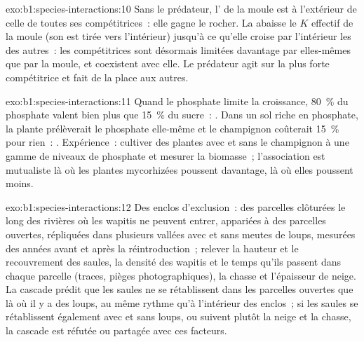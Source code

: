 \begin{solution}{exo:b1:species-interactions:10}
Sans le prédateur, l' de la moule est à l'extérieur de celle de
toutes ses compétitrices~: elle gagne le rocher. La  abaisse le
$K$ effectif de la moule (son  est tirée vers l'intérieur)
jusqu'à ce qu'elle croise par l'intérieur les  des autres~: les
compétitrices sont désormais limitées davantage par elles-mêmes que par
la moule, et coexistent avec elle. Le prédateur agit sur la plus forte
compétitrice et fait de la place aux autres.
\end{solution}

\begin{solution}{exo:b1:species-interactions:11}
Quand le phosphate limite la croissance, \qty{80}{\%} du phosphate
valent bien plus que \qty{15}{\%} du sucre~: . Dans un sol
riche en phosphate, la plante prélèverait le phosphate elle-même et le
champignon coûterait \qty{15}{\%} pour rien~: . Expérience~:
cultiver des plantes avec et sans le champignon à une gamme de niveaux
de phosphate et mesurer la biomasse~; l'association est mutualiste là où
les plantes mycorhizées poussent davantage,  là où elles
poussent moins.
\end{solution}

\begin{solution}{exo:b1:species-interactions:12}
Des enclos d'exclusion~: des parcelles clôturées le long des rivières
où les wapitis ne peuvent entrer, appariées à des parcelles ouvertes,
répliquées dans plusieurs vallées avec et sans meutes de loups,
mesurées des années avant et après la réintroduction~; relever la
hauteur et le recouvrement des saules, la densité des wapitis et le
temps qu'ils passent dans chaque parcelle (traces, pièges
photographiques), la chasse et l'épaisseur de neige. La cascade prédit
que les saules ne se rétablissent dans les parcelles ouvertes que là où
il y a des loups, au même rythme qu'à l'intérieur des enclos~; si les
saules se rétablissent également avec et sans loups, ou suivent plutôt
la neige et la chasse, la cascade est réfutée ou partagée avec ces
facteurs.
\end{solution}


